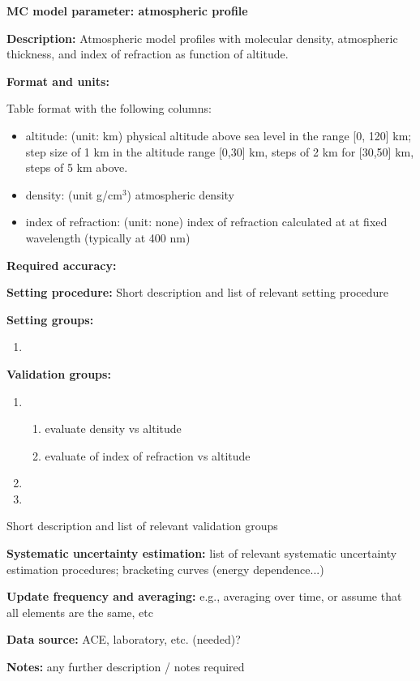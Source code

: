 \textbf{MC model parameter: atmospheric profile}

\textbf{Description: }
Atmospheric model profiles with molecular density, atmospheric thickness, and index of refraction as function of altitude.

\textbf{Format and units:}

Table format with the following columns:

\begin{itemize}
\item altitude: (unit: km) physical altitude above sea level in the range [0, 120] km; step size of 1 km in the altitude range [0,30] km, steps of 2 km for [30,50] km, steps of 5 km above.

\item density: (unit g/cm$^3$) atmospheric density

\item index of refraction: (unit: none) index of refraction calculated at at fixed wavelength (typically at 400 nm)

\end{itemize}



\textbf{Required accuracy:}

\textbf{Setting procedure:}
Short description and list of relevant setting procedure

\textbf{Setting groups:}

\begin{enumerate}
    \item {}
\end{enumerate}

\textbf{Validation groups:}

\begin{enumerate}
    \item {}
    \begin{enumerate}
         \item evaluate density vs altitude
         \item evaluate of index of refraction vs altitude
    \end{enumerate}
    \item {}
    \item {}
\end{enumerate}

Short description and list of relevant validation groups 

\textbf{Systematic uncertainty estimation:}
list of relevant systematic uncertainty estimation procedures; bracketing curves (energy dependence...) 

\textbf{Update frequency and averaging:}
e.g., averaging over time, or assume that all elements are the same, etc

\textbf{Data source:}
ACE, laboratory, etc. (needed)?

\textbf{Notes:}
 any further description / notes required
